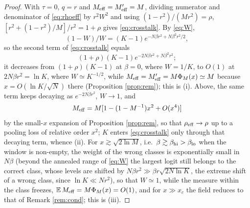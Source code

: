 \documentclass[11pt,a4paper]{article}
\newcommand{\E}{\mathbb{E}}
\newcommand{\Meff}{M_{\rm eff}}
\begin{document}
\begin{proof}
With $\tau=0$, $q=r$ and $\Meff=\Meff'=M$, dividing numerator and denominator of \eqref{eq:rhoeff} by $r^2W^2$ and using $(1-r^2)/(Mr^2)=\rho$, $[r^2+(1-r^2)/M]/r^2=1+\rho$ gives \eqref{eq:crosstalk}. By \eqref{eq:W},
\begin{equation*}
(1-W)/W=(K-1)e^{-N\beta r^2+N\beta^2r^2/2},
\end{equation*}
so the second term of \eqref{eq:crosstalk} equals
\begin{equation*}
(1+\rho)(K-1)e^{-2N\beta r^2+N\beta^2r^2};
\end{equation*}
it decreases from $(1+\rho)(K-1)$ at $\beta=0$, where $W=1/K$, to $O(1)$ at $2N\beta r^2=\ln K$, where $W\simeq K^{-1/2}$, while $\Meff=\Meff'=M\Phi_M(x)\simeq M$ because $x=O(\ln K/\sqrt N)$ there (Proposition \ref{prop:rem}); this is (i). Above, the same term keeps decaying as $e^{-2N\beta r^2}$, $W\to1$, and
\begin{equation*}
\Meff=M[1-(1-M^{-1})x^2+O(x^4)]
\end{equation*}
by the small-$x$ expansion of Proposition \ref{prop:rem}, so that $\rho_{\rm eff}\to\rho$ up to a pooling loss of relative order $x^2$; $K$ enters \eqref{eq:crosstalk} only through that decaying term, whence (ii). For $x\gtrsim\sqrt{2\ln M}$, i.e.\ $\beta\gtrsim\beta_{\rm hi}>\beta_{\rm lo}$ when the window is non-empty, the weight of the wrong classes is exponentially small in $N\beta$ (beyond the annealed range of \eqref{eq:W} the largest logit still belongs to the correct class, whose levels are shifted by $N\beta r^2\gg\beta r\sqrt{2N\ln K}$, the extreme shift of a wrong class, since $\ln K\ll Nr^2$), so that $W\simeq1$, while the measure within the class freezes, $\E\,\Meff=M\Phi_M(x)=O(1)$, and for $x\gg x_c$ the field reduces to that of Remark \ref{rem:cond}; this is (iii).


\end{proof}
\end{document}
